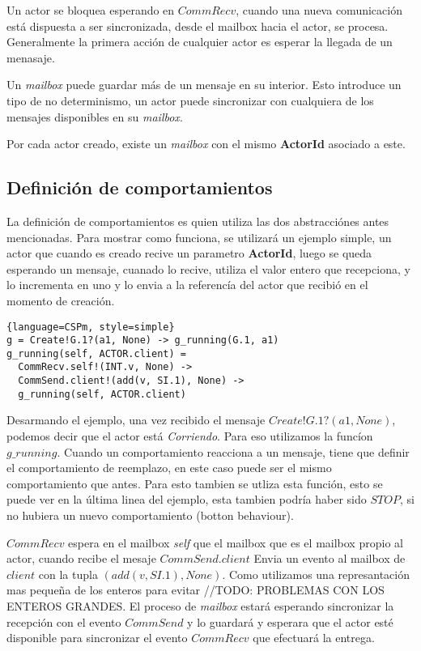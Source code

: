 \documentclass[fleqn]{article}
\begin{document}
Un actor se bloquea esperando en $CommRecv$, cuando una nueva comunicación está
dispuesta a ser sincronizada, desde el mailbox hacia el actor, se procesa.
Generalmente la primera acción de cualquier actor es esperar la llegada de un
menasaje.

Un \textit{mailbox} puede guardar más de un mensaje en su interior. Esto
introduce un tipo de no determinismo, un actor puede sincronizar con cualquiera
de los mensajes disponibles en su \textit{mailbox}.

Por cada actor creado, existe un \textit{mailbox} con el mismo \textbf{ActorId}
asociado a este. 

\subsection{Definición de comportamientos}
La definición de comportamientos es quien utiliza las dos abstracciónes antes
mencionadas.
Para mostrar como funciona, se utilizará un ejemplo simple, un actor que cuando
es creado recive un parametro \textbf{ActorId}, luego se queda esperando un
mensaje, cuanado lo recive, utiliza el valor entero que recepciona, y lo
incrementa en uno y lo envia a la referencía del actor que recibió en el
momento de creación.

\begin{lstlisting}{language=CSPm, style=simple}
g = Create!G.1?(a1, None) -> g_running(G.1, a1) 
g_running(self, ACTOR.client) =
  CommRecv.self!(INT.v, None) ->
  CommSend.client!(add(v, SI.1), None) ->
  g_running(self, ACTOR.client)
\end{lstlisting}

Desarmando el ejemplo, una vez recibido el mensaje $Create!G.1?(a1, None)$,
podemos decir que el actor está \textit{Corriendo}. Para eso utilizamos la
funcíon $g\_running$. Cuando un comportamiento reacciona a un mensaje, tiene que
definir el comportamiento de reemplazo, en este caso puede ser el mismo
comportamiento que antes. Para esto tambien se utliza esta función, esto se
puede ver en la última linea del ejemplo, esta tambien podría haber sido $STOP$,
si no hubiera un nuevo comportamiento (botton behaviour).

$CommRecv$ espera en el mailbox \textit{self} que el mailbox que es el mailbox
propio al actor, cuando recibe el mesaje $CommSend.client$ Envia un evento al
mailbox de $client$ con la tupla $(add(v, SI.1), None)$. Como utilizamos una
represantación mas pequeña de los enteros para evitar //TODO: PROBLEMAS CON LOS
ENTEROS GRANDES. El proceso de \textit{mailbox} estará esperando sincronizar
la recepción con el evento $CommSend$ y lo guardará y esperara que el actor esté
disponible para sincronizar el evento $CommRecv$ que efectuará la entrega.
\end{document}

